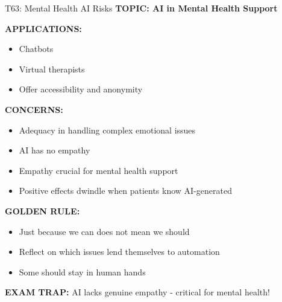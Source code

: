 \documentclass[8pt]{beamer}
\begin{document}
	\begin{frame}{T63: Mental Health AI Risks}
		\fontsize{6.5}{7.5}\selectfont
		\textbf{TOPIC: AI in Mental Health Support}
		
		\vspace{0.1cm}
		\textbf{APPLICATIONS:}
		\begin{itemize}
			\item Chatbots
			\item Virtual therapists
			\item Offer accessibility and anonymity
		\end{itemize}
		
		\vspace{0.1cm}
		\textbf{CONCERNS:}
		\begin{itemize}
			\item Adequacy in handling complex emotional issues
			\item AI has no empathy
			\item Empathy crucial for mental health support
			\item Positive effects dwindle when patients know AI-generated
		\end{itemize}
		
		\vspace{0.1cm}
		\textbf{GOLDEN RULE:}
		\begin{itemize}
			\item Just because we can does not mean we should
			\item Reflect on which issues lend themselves to automation
			\item Some should stay in human hands
		\end{itemize}
		
		\textcolor{myred}{\textbf{EXAM TRAP:}} AI lacks \textcolor{myblue}{genuine empathy} - critical for mental health!
	\end{frame}
	
\end{document}
